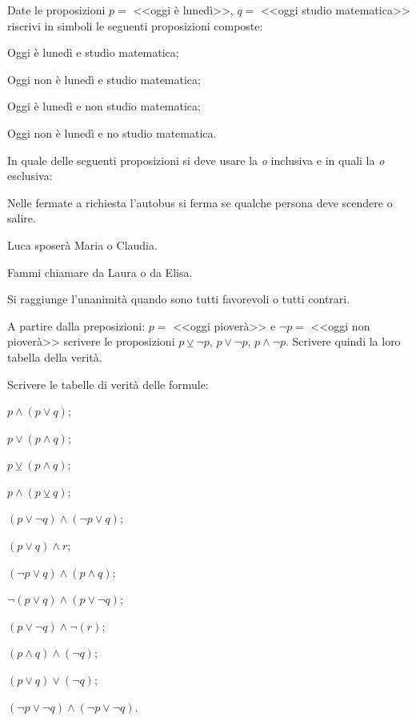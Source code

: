 \begin{esercizio}
\label{ese:\thechapter.5}
Date le proposizioni $ p = $ <<oggi è lunedì>>, $ q = $ <<oggi studio matematica>>
riscrivi in simboli le seguenti proposizioni composte:
\begin{enumeratea}
\item Oggi è lunedì e studio matematica;
\item Oggi non è lunedì e studio matematica;
\item Oggi è lunedì e non studio matematica;
\item Oggi non è lunedì e no studio matematica.
\end{enumeratea}
\end{esercizio}

\begin{esercizio}
\label{ese:\thechapter.6}
In quale delle seguenti proposizioni si deve usare la \emph{o} inclusiva e
in quali la \emph{o} esclusiva:
\begin{enumeratea}
\item Nelle fermate a richiesta l'autobus si ferma se qualche persona deve scendere o salire.
\item Luca sposerà Maria o Claudia.
\item Fammi chiamare da Laura o da Elisa.
\item Si raggiunge l’unanimità quando sono tutti favorevoli o tutti
contrari.
\end{enumeratea}
\end{esercizio}

\begin{esercizio}
\label{ese:\thechapter.7}
A partire dalla preposizioni: $ p = $ <<oggi pioverà>> e  $\neg p =$ <<oggi
non pioverà>> scrivere le proposizioni  $p\veebar \neg p$, $p\vee \neg p$, $p\wedge \neg
p$. Scrivere quindi la loro tabella della verità.
\end{esercizio}

\begin{esercizio}
\label{ese:\thechapter.8}
Scrivere le tabelle di verità delle formule:
 \begin{multicols}{2}
 \begin{enumeratea}
 \item $p\wedge (p\vee q)$;
 \item $p\vee (p\wedge q)$;
 \item $p\veebar(p\wedge q)$;
 \item $p\wedge (p\veebar q)$;
 \item $(p\vee \neg q)\wedge (\neg p\vee q)$;
 \item $(p\vee q)\wedge r$;
 \item $(\neg p\vee q)\wedge (p\wedge q)$;
 \item $\neg (p\vee q)\wedge (p\vee \neg q)$;
 \item $(p\vee \neg q)\wedge \neg (r)$;
 \item $(p\wedge q)\wedge (\neg q)$;
 \item $(p\vee q)\vee (\neg q)$;
 \item $(\neg p\vee \neg q)\wedge (\neg p\vee \neg q)$.
 \end{enumeratea}
 \end{multicols}
\end{esercizio}

